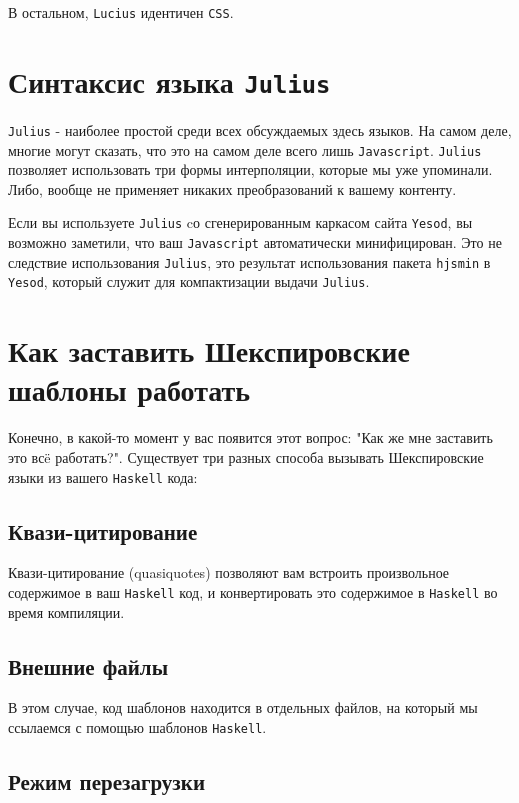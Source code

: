 В остальном, \texttt{Lucius} идентичен \texttt{CSS}.

\section{Синтаксис языка \texttt{Julius}}

\texttt{Julius} - наиболее простой среди всех обсуждаемых здесь языков. На
самом деле, многие могут сказать, что это на самом деле всего лишь
\texttt{Javascript}. \texttt{Julius} позволяет использовать три формы
интерполяции, которые мы уже упоминали.  Либо, вообще не применяет никаких
преобразований к вашему контенту.

\begin{remark}
    Если вы используете \texttt{Julius} cо сгенерированным каркасом сайта
    \texttt{Yesod}, вы возможно заметили, что ваш \texttt{Javascript}
    автоматически минифицирован. Это не следствие использования
    \texttt{Julius}, это результат использования пакета \lstinline!hjsmin! в
    \texttt{Yesod}, который служит для компактизации выдачи \texttt{Julius}.
\end{remark}

\section{Как заставить Шекспировские шаблоны работать}

Конечно, в какой-то момент у вас появится этот вопрос: "Как же мне заставить
это всë работать?". Существует три разных способа вызывать Шекспировские языки
из вашего \texttt{Haskell} кода:

\subsection{Квази-цитирование}

Квази-цитирование (quasiquotes) позволяют вам встроить произвольное содержимое
в ваш \texttt{Haskell} код, и конвертировать это содержимое в \texttt{Haskell}
во время компиляции.

\subsection {Внешние файлы}

В этом случае, код шаблонов находится в отдельных файлов, на который мы
ссылаемся с помощью шаблонов \texttt{Haskell}.

\subsection {Режим перезагрузки}

